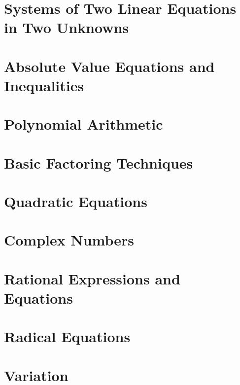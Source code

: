 

\newpage

\section{Systems of Two Linear Equations in Two Unknowns}



\newpage

\section{Absolute Value Equations and Inequalities}



\newpage

\section{Polynomial Arithmetic}



\newpage

\section{Basic Factoring Techniques}



\newpage

\section{Quadratic Equations}



\newpage

\section{Complex Numbers}



\newpage

\section{Rational Expressions and Equations}



\newpage

\section{Radical Equations}



\newpage

\section{Variation}



\newpage